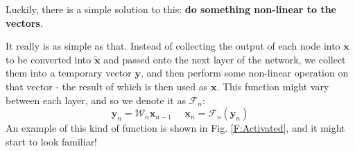 \documentclass[a4paper,openany,11pt]{book}
\newcommand\cec[1]{\tilde{\vec{#1}}}
\renewcommand\vec[1]{\boldsymbol{\mathbf{#1}}}
\begin{document}
				Luckily, there is a simple solution to this: \textbf{do something non-linear to the vectors}. 

				It really is as simple as that. Instead of collecting the output of each node into $\vec{x}$ to be converted into $\cec{x}$ and passed onto the next layer of the network, we collect them into a temporary vector $\vec{y}$, and then perform some non-linear operation on that vector - the result of which is then used as $\vec{x}$. This function might vary between each layer, and so we denote it as $\mathcal{F}_n$:
				\begin{equation}
					\vec{y}_n = \mathcal{W}_n \vec{x}_{n-1} ~~~~~~ \vec{x}_n = \mathcal{F}_n(\vec{y}_n)
				\end{equation}
				An example of this kind of function is shown in Fig. \ref{F:Activated}, and it might start to look familiar!
\end{document}
